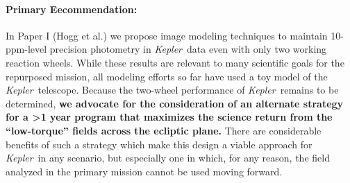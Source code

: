 \documentclass[12pt, preprint]{aastex}
\newcommand{\observatory}[1]{\textsl{#1}}
\newcommand{\kepler}{\observatory{Kepler}}
\newcommand{\Kepler}{\kepler}
\begin{document}
\paragraph{Primary Eecommendation:}
In Paper I (Hogg et al.) we propose image modeling techniques to 
  maintain 10-ppm-level precision photometry in \Kepler\ data even with only two working 
  reaction wheels. 
While these results are relevant to many scientific goals
  for the repurposed mission, all modeling efforts so far have used a toy 
  model of the \Kepler\ telescope. 
Because the two-wheel performance of \Kepler\ remains to be determined, 
 \textbf{we 
 advocate for the consideration of an alternate strategy for a >1 year program
 that maximizes the science return from the ``low-torque'' fields across the
 ecliptic plane.}
There are considerable benefits of such a strategy which make this design a 
  viable approach for \Kepler\ in any scenario, but especially one in which, 
  for any reason, the field analyzed in the primary mission cannot be used 
  moving forward.
\end{document}
